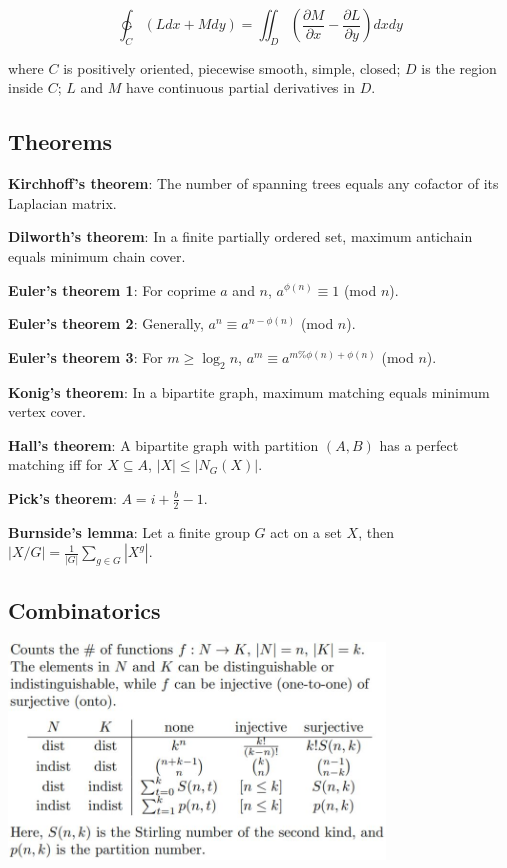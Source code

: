 \begin{displaymath}
    \ointctrclockwise _C (Ldx+Mdy) = \iint _D (\frac{\partial M}{\partial x} - \frac{\partial L}{\partial y})dxdy
\end{displaymath}

where $C$ is positively oriented, piecewise smooth, simple, closed; $D$ is the region inside $C$; $L$ and $M$ have continuous partial derivatives in $D$.

\subsection{Theorems}

\textbf{Kirchhoff's theorem}: The number of spanning trees equals any cofactor of its Laplacian matrix.

\textbf{Dilworth's theorem}: In a finite partially ordered set, maximum antichain equals minimum chain cover.

\textbf{Euler's theorem 1}: For coprime $a$ and $n$, $a^{\phi(n)} \equiv 1$ (mod $n$).

\textbf{Euler's theorem 2}: Generally, $a^n \equiv a^{n-\phi(n)}$ (mod $n$).

\textbf{Euler's theorem 3}: For $m \geq \log_2 n$, $a^m \equiv a^{m\%\phi(n) + \phi(n)}$ (mod $n$).

\textbf{Konig's theorem}: In a bipartite graph, maximum matching equals minimum vertex cover.

\textbf{Hall's theorem}: A bipartite graph with partition $(A,B)$ has a perfect matching iff for $X \subseteq A$, $|X| \leq |N_G(X)|$.

\textbf{Pick's theorem}: $A = i+\frac{b}{2}-1$.

\textbf{Burnside's lemma}: Let a finite group $G$ act on a set $X$, then $|X/G| = \frac{1}{|G|}\sum_{g \in G}|X^g|$.

\subsection{Combinatorics}

\includegraphics[width=10cm]{twelvefold.JPG}

